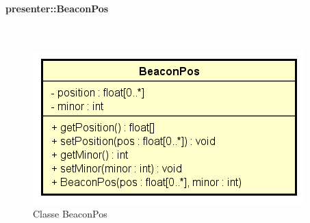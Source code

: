 \documentclass[../DefinizioneDiProdotto.tex]{subfiles}
\begin{document}
\paragraph{presenter::BeaconPos}
\
\begin{figure}[H]
	\centering
	\includegraphics[width=\maxwidth]{img/BeaconPos.png}
	\caption{Classe BeaconPos}\label{fig:presenter::BeaconPos} 
\end{figure}
\end{document}

